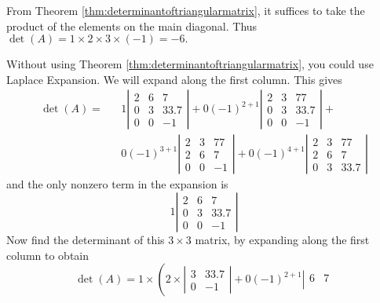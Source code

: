 \begin{solution} From Theorem \ref{thm:determinantoftriangularmatrix}, it suffices to take the product of the elements on 
the main diagonal. Thus $\det \left( A\right) =1\times 2\times 3\times \left(
-1\right) =-6.$ 

Without using Theorem \ref{thm:determinantoftriangularmatrix}, you could use Laplace Expansion. 
We will expand along the
first column. This gives
\begin{eqnarray*}
\det \left(A\right) = 
&&1\left|
\begin{array}{rrr}
2 & 6 & 7 \\
0 & 3 & 33.7 \\
0 & 0 & -1
\end{array}
\right| +0\left( -1\right) ^{2+1}\left|
\begin{array}{rrr}
2 & 3 & 77 \\
0 & 3 & 33.7 \\
0 & 0 & -1
\end{array}
\right| + \\
&&0\left( -1\right) ^{3+1}\left|
\begin{array}{rrr}
2 & 3 & 77 \\
2 & 6 & 7 \\
0 & 0 & -1
\end{array}
\right| +0\left( -1\right) ^{4+1}\left|
\begin{array}{rrr}
2 & 3 & 77 \\
2 & 6 & 7 \\
0 & 3 & 33.7
\end{array}
\right|
\end{eqnarray*}
and the only nonzero term in the expansion is
\begin{equation*}
1\left|
\begin{array}{rrr}
2 & 6 & 7 \\
0 & 3 & 33.7 \\
0 & 0 & -1
\end{array}
\right| 
\end{equation*}
Now find the determinant of this $3 \times 3$ matrix, by expanding along the first column to obtain
\begin{equation*}
\det \left(A\right) 
=
1\times \left( 2\times \left|
\begin{array}{rr}
3 & 33.7 \\
0 & -1
\end{array}
\right| +0\left( -1\right) ^{2+1}\left|
\begin{array}{rr}
6 & 7 \\

\end{array}
\end{equation*}
\end{solution}
